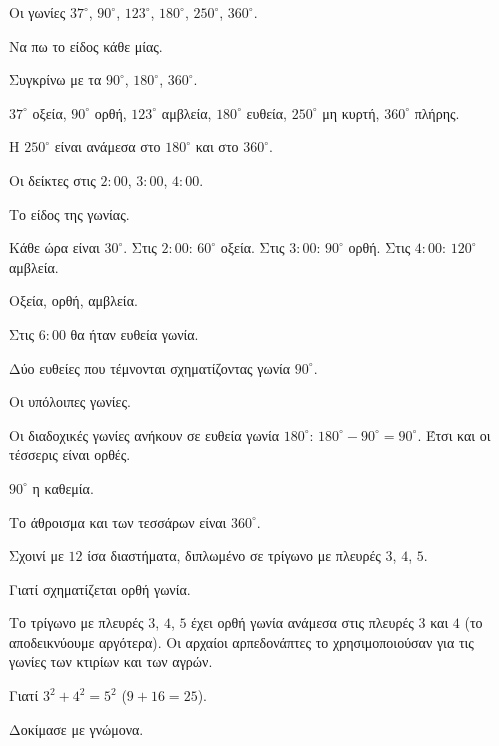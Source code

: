 
\tixero Οι γωνίες $37^\circ$, $90^\circ$, $123^\circ$, $180^\circ$, $250^\circ$, $360^\circ$.\par
\tithelo Να πω το είδος κάθε μίας.\par
\possindeo Συγκρίνω με τα $90^\circ$, $180^\circ$, $360^\circ$.\par
\apantisi $37^\circ$ οξεία, $90^\circ$ ορθή, $123^\circ$ αμβλεία, $180^\circ$ ευθεία, $250^\circ$ μη κυρτή, $360^\circ$ πλήρης.\par
\elegxos Η $250^\circ$ είναι ανάμεσα στο $180^\circ$ και στο $360^\circ$.

\tixero Οι δείκτες στις $2{:}00$, $3{:}00$, $4{:}00$.\par
\tithelo Το είδος της γωνίας.\par
\possindeo Κάθε ώρα είναι $30^\circ$. Στις $2{:}00$: $60^\circ$ οξεία. Στις $3{:}00$: $90^\circ$ ορθή. Στις $4{:}00$: $120^\circ$ αμβλεία.\par
\apantisi Οξεία, ορθή, αμβλεία.\par
\elegxos Στις $6{:}00$ θα ήταν ευθεία γωνία.

\tixero Δύο ευθείες που τέμνονται σχηματίζοντας γωνία $90^\circ$.\par
\tithelo Οι υπόλοιπες γωνίες.\par
\possindeo Οι διαδοχικές γωνίες ανήκουν σε ευθεία γωνία $180^\circ$: $180^\circ-90^\circ=90^\circ$. Έτσι και οι τέσσερις είναι ορθές.\par
\apantisi $90^\circ$ η καθεμία.\par
\elegxos Το άθροισμα και των τεσσάρων είναι $360^\circ$.

\tixero Σχοινί με $12$ ίσα διαστήματα, διπλωμένο σε τρίγωνο με πλευρές $3$, $4$, $5$.\par
\tithelo Γιατί σχηματίζεται ορθή γωνία.\par
\possindeo Το τρίγωνο με πλευρές $3$, $4$, $5$ έχει ορθή γωνία ανάμεσα στις πλευρές $3$ και $4$ (το αποδεικνύουμε αργότερα). Οι αρχαίοι αρπεδονάπτες το χρησιμοποιούσαν για τις γωνίες των κτιρίων και των αγρών.\par
\apantisi Γιατί $3^2+4^2=5^2$ ($9+16=25$).\par
\elegxos Δοκίμασε με γνώμονα.



